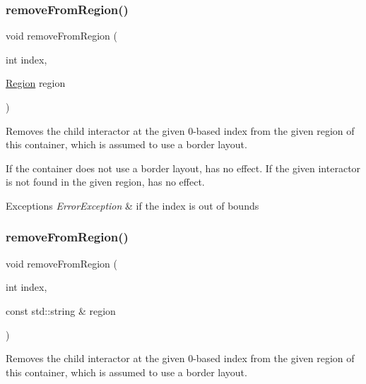 \subsubsection{\texorpdfstring{remove\+From\+Region()}{removeFromRegion()}\hspace{0.1cm}{\footnotesize\ttfamily [5/6]}}
{\footnotesize\ttfamily void remove\+From\+Region (\begin{DoxyParamCaption}\item[{int}]{index,  }\item[{\mbox{\hyperlink{classGContainer_a81a01a86de31071a92e6cce0bab9bc4b}{Region}}}]{region }\end{DoxyParamCaption})\hspace{0.3cm}{\ttfamily [virtual]}}



Removes the child interactor at the given 0-\/based index from the given region of this container, which is assumed to use a border layout. 

If the container does not use a border layout, has no effect. If the given interactor is not found in the given region, has no effect. 
\begin{DoxyExceptions}{Exceptions}
{\em Error\+Exception} & if the index is out of bounds \\
\hline
\end{DoxyExceptions}
\mbox{\label{classGContainer_ac839e32fec6ea6b37f6c6da8aa6ce43b}} 
\subsubsection{\texorpdfstring{remove\+From\+Region()}{removeFromRegion()}\hspace{0.1cm}{\footnotesize\ttfamily [6/6]}}
{\footnotesize\ttfamily void remove\+From\+Region (\begin{DoxyParamCaption}\item[{int}]{index,  }\item[{const std\+::string \&}]{region }\end{DoxyParamCaption})\hspace{0.3cm}{\ttfamily [virtual]}}



Removes the child interactor at the given 0-\/based index from the given region of this container, which is assumed to use a border layout. 

